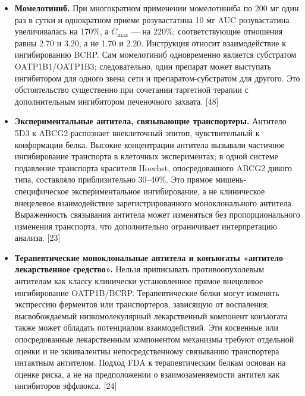 \documentclass[11pt]{article}
\begin{document}
\begin{itemize}
\item \textbf{Момелотиниб.} При многократном применении момелотиниба по 200 мг один раз в сутки и однократном приеме розувастатина 10 мг AUC розувастатина увеличивалась на 170\%, а \(C_{\max}\) --- на 220\%; соответствующие отношения равны 2.70 и 3.20, а не 1.70 и 2.20. Инструкция относит взаимодействие к ингибированию BCRP. Сам момелотиниб одновременно является субстратом OATP1B1/OATP1B3; следовательно, один препарат может выступать ингибитором для одного звена сети и препаратом-субстратом для другого. Это обстоятельство существенно при сочетании таргетной терапии с дополнительным ингибитором печеночного захвата. [48]
\item \textbf{Экспериментальные антитела, связывающие транспортеры.} Антитело 5D3 к ABCG2 распознает внеклеточный эпитоп, чувствительный к конформации белка. Высокие концентрации антитела вызывали частичное ингибирование транспорта в клеточных экспериментах; в одной системе подавление транспорта красителя Hoechst, опосредованного ABCG2 дикого типа, составляло приблизительно 30--40\%. Это прямое мишень-специфическое экспериментальное ингибирование, а не клиническое внецелевое взаимодействие зарегистрированного моноклонального антитела. Выраженность связывания антитела может изменяться без пропорционального изменения транспорта, что дополнительно ограничивает интерпретацию анализа. [23]
\item \textbf{Терапевтические моноклональные антитела и конъюгаты «антитело--лекарственное средство».} Нельзя приписывать противоопухолевым антителам как классу клинически установленное прямое внецелевое ингибирование OATP1B/BCRP. Терапевтические белки могут изменять экспрессию ферментов или транспортеров, зависящую от воспаления; высвобождаемый низкомолекулярный лекарственный компонент конъюгата также может обладать потенциалом взаимодействий. Эти косвенные или опосредованные лекарственным компонентом механизмы требуют отдельной оценки и не эквивалентны непосредственному связыванию транспортера интактным антителом. Подход FDA к терапевтическим белкам основан на оценке риска, а не на предположении о взаимозаменяемости антител как ингибиторов эффлюкса. [24]
\end{itemize}
\end{document}
